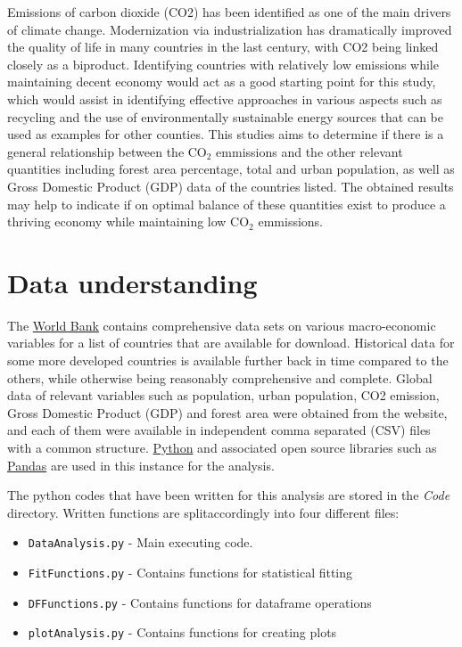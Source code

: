 \documentclass[11pt,a4paper,titlepage]{article}
\newcommand{\blankline}{\quad\pagebreak[2]}
\begin{document}
\blankline

Emissions of carbon dioxide (CO2) has been identified as one of the main drivers of climate change. Modernization via industrialization has dramatically improved the quality of life in many countries in the last century, with CO2 being linked closely as a biproduct. Identifying countries with relatively low emissions while maintaining decent economy would act as a good starting point for this study, which would assist in identifying effective approaches in various aspects such as recycling and the use of environmentally sustainable energy sources that can be used as examples for other counties. This studies aims to determine if there is a general relationship between the CO$_{2}$ emmissions and the other relevant quantities including forest area percentage, total and urban population, as well as Gross Domestic Product (GDP) data of the countries listed. The obtained results may help to indicate if on optimal balance of these quantities exist to produce a thriving economy while maintaining low CO$_{2}$ emmissions.

\blankline

\section{Data understanding}

\blankline

The \href{https://www.worldbank.org/}{World Bank} contains comprehensive data sets on various macro-economic variables for a list of countries that are available for download. Historical data for some more developed countries is available further back in time compared to the others, while otherwise being reasonably comprehensive and complete. Global data of relevant variables such as population, urban population, CO2 emission, Gross Domestic Product (GDP) and forest area were obtained from the website, and each of them were available in independent comma separated (CSV) files with a common structure. \href{https://www.python.org/}{Python} and associated open source libraries such as \href{https://pandas.pydata.org/}{Pandas} are used in this instance for the analysis.

\blankline

The python codes that have been written for this analysis are stored in the \textit{Code} directory. Written functions are splitaccordingly into four different files:

\begin{itemize}
    \item \texttt{DataAnalysis.py} - Main executing code.
    \item \texttt{FitFunctions.py} - Contains functions for statistical fitting
    \item \texttt{DFFunctions.py} - Contains functions for dataframe operations
    \item \texttt{plotAnalysis.py} - Contains functions for creating plots
\end{itemize}
\end{document}
